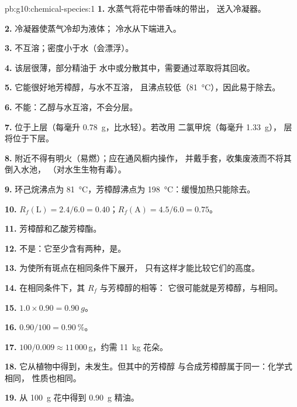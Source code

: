 \begin{solution}{pb:g10:chemical-species:1}
\textbf{1.} 水蒸气将花中带香味的带出，
送入冷凝器。

\textbf{2.} 冷凝器使蒸气冷却为液体；
冷水从下端进入。

\textbf{3.} 不互溶；密度小于水（会漂浮）。

\textbf{4.} 该层很薄，部分精油于
水中或分散其中，需要通过萃取将其回收。

\textbf{5.} 它能很好地芳樟醇，与水不互溶，
且沸点较低（\qty{81}{\celsius}），因此易于除去。

\textbf{6.} 不能：乙醇与水互溶，不会分层。

\textbf{7.} 位于上层（每毫升 \qty{0.78}{g}，比水轻）。若改用
二氯甲烷（每毫升 \qty{1.33}{g}），
层将位于下层。

\textbf{8.} 附近不得有明火（易燃）；应在通风橱内操作，
并戴手套，收集废液而不将其倒入水池，
（对水生生物有毒）。

\textbf{9.} 环己烷沸点为 \qty{81}{\celsius}，芳樟醇沸点为
\qty{198}{\celsius}：缓慢加热只能除去。

\textbf{10.} $R_f(\text{L}) = 2.4/6.0 = 0.40$；$R_f(\text{A}) = 4.5/6.0
= 0.75$。

\textbf{11.} 芳樟醇和乙酸芳樟酯。

\textbf{12.} 不是：它至少含有两种，是。

\textbf{13.} 为使所有斑点在相同条件下展开，
只有这样才能比较它们的高度。

\textbf{14.} 在相同条件下，其 $R_f$ 与芳樟醇的相等：
它很可能就是芳樟醇，与相同。

\textbf{15.} $1.0 \times 0.90 = \qty{0.90}{g}$。

\textbf{16.} $0.90/100 = \qty{0.90}{\percent}$。

\textbf{17.} $100/0.009 \approx 11\,000$\,g，约需
\qty{11}{kg} 花朵。

\textbf{18.} 它从植物中得到，未发生。但其中的芳樟醇
与合成芳樟醇属于同一：化学式相同，
性质也相同。

\textbf{19.} 从 \qty{100}{g} 花中得到 \qty{0.90}{g} 精油。
\end{solution}
